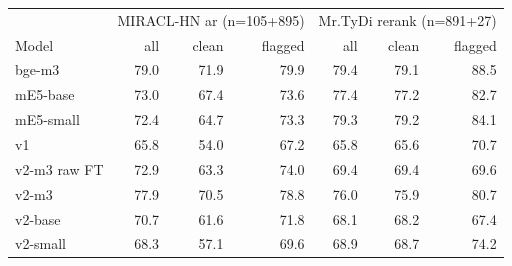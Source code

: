 \begin{tabular}{@{}lrrrrrr@{}}
\toprule
 & \multicolumn{3}{c}{MIRACL-HN ar (n=105+895)} & \multicolumn{3}{c}{Mr.TyDi rerank (n=891+27)} \\
Model & all & clean & flagged & all & clean & flagged \\
\midrule
bge-m3 & 79.0 & 71.9 & 79.9 & 79.4 & 79.1 & 88.5 \\
mE5-base & 73.0 & 67.4 & 73.6 & 77.4 & 77.2 & 82.7 \\
mE5-small & 72.4 & 64.7 & 73.3 & 79.3 & 79.2 & 84.1 \\
v1 & 65.8 & 54.0 & 67.2 & 65.8 & 65.6 & 70.7 \\
v2-m3 raw FT & 72.9 & 63.3 & 74.0 & 69.4 & 69.4 & 69.6 \\
v2-m3 & 77.9 & 70.5 & 78.8 & 76.0 & 75.9 & 80.7 \\
v2-base & 70.7 & 61.6 & 71.8 & 68.1 & 68.2 & 67.4 \\
v2-small & 68.3 & 57.1 & 69.6 & 68.9 & 68.7 & 74.2 \\
\bottomrule
\end{tabular}
